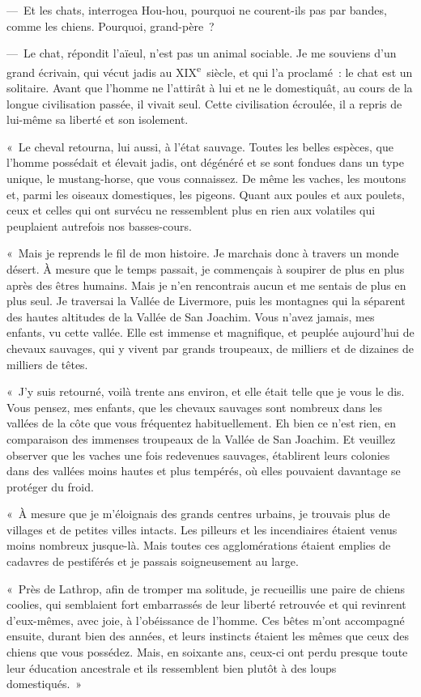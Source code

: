 \documentclass[french,twoside]{book} %
\begin{document}
— Et les chats, interrogea Hou-hou, pourquoi ne courent-ils pas par bandes, comme les chiens. Pourquoi, grand-père ?\par
— Le chat, répondit l’aïeul, n’est pas un animal sociable. Je me souviens d’un grand écrivain, qui vécut jadis au XIX\textsuperscript{e} siècle, et qui l’a proclamé : le chat est un solitaire. Avant que l’homme ne l’attirât à lui et ne le domestiquât, au cours de la longue civilisation passée, il vivait seul. Cette civilisation écroulée, il a repris de lui-même sa liberté et son isolement.\par
« Le cheval retourna, lui aussi, à l’état sauvage. Toutes les belles espèces, que l’homme possédait et élevait jadis, ont dégénéré et se sont fondues dans un type unique, le mustang-horse, que vous connaissez. De même les vaches, les moutons et, parmi les oiseaux domestiques, les pigeons. Quant aux poules et aux poulets, ceux et celles qui ont survécu ne ressemblent plus en rien aux volatiles qui peuplaient autrefois nos basses-cours.\par
« Mais je reprends le fil de mon histoire. Je marchais donc à travers un monde désert. À mesure que le temps passait, je commençais à soupirer de plus en plus après des êtres humains. Mais je n’en rencontrais aucun et me sentais de plus en plus seul. Je traversai la Vallée de Livermore, puis les montagnes qui la séparent des hautes altitudes de la Vallée de San Joachim. Vous n’avez jamais, mes enfants, vu cette vallée. Elle est immense et magnifique, et peuplée aujourd’hui de chevaux sauvages, qui y vivent par grands troupeaux, de milliers et de dizaines de milliers de têtes.\par
« J’y suis retourné, voilà trente ans environ, et elle était telle que je vous le dis. Vous pensez, mes enfants, que les chevaux sauvages sont nombreux dans les vallées de la côte que vous fréquentez habituellement. Eh bien ce n’est rien, en comparaison des immenses troupeaux de la Vallée de San Joachim. Et veuillez observer que les vaches une fois redevenues sauvages, établirent leurs colonies dans des vallées moins hautes et plus tempérés, où elles pouvaient davantage se protéger du froid.\par
« À mesure que je m’éloignais des grands centres urbains, je trouvais plus de villages et de petites villes intacts. Les pilleurs et les incendiaires étaient venus moins nombreux jusque-là. Mais toutes ces agglomérations étaient emplies de cadavres de pestiférés et je passais soigneusement au large.\par
« Près de Lathrop, afin de tromper ma solitude, je recueillis une paire de chiens coolies, qui semblaient fort embarrassés de leur liberté retrouvée et qui revinrent d’eux-mêmes, avec joie, à l’obéissance de l’homme. Ces bêtes m’ont accompagné ensuite, durant bien des années, et leurs instincts étaient les mêmes que ceux des chiens que vous possédez. Mais, en soixante ans, ceux-ci ont perdu presque toute leur éducation ancestrale et ils ressemblent bien plutôt à des loups domestiqués. »\par
\end{document}
